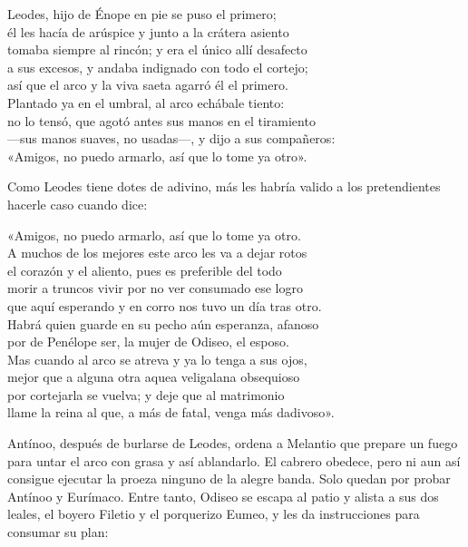 \begin{versocita}
Leodes, hijo de Énope en pie se puso el primero;\\
él les hacía de arúspice y junto a la crátera asiento\\
tomaba siempre al rincón; y era el único allí desafecto\\
a sus excesos, y andaba indignado con todo el cortejo;\\
así que el arco y la viva saeta agarró él el primero.\\
Plantado ya en el umbral, al arco echábale tiento:\\
no lo tensó, que agotó antes sus manos en el tiramiento\\
---sus manos suaves, no usadas---, y dijo a sus compañeros:\\
«Amigos, no puedo armarlo, así que lo tome ya otro».
\end{versocita}

Como Leodes tiene dotes de adivino, más les habría valido a los pretendientes hacerle caso cuando dice:

\begin{versocita}
«Amigos, no puedo armarlo, así que lo tome ya otro.\\
A muchos de los mejores este arco les va a dejar rotos\\
el corazón y el aliento, pues es preferible del todo\\
morir a truncos vivir por no ver consumado ese logro\\
que aquí esperando y en corro nos tuvo un día tras otro.\\
Habrá quien guarde en su pecho aún esperanza, afanoso\\
por de Penélope ser, la mujer de Odiseo, el esposo.\\
Mas cuando al arco se atreva y ya lo tenga a sus ojos,\\
mejor que a alguna otra aquea veligalana obsequioso\\
por cortejarla se vuelva; y deje que al matrimonio\\
llame la reina al que, a más de fatal, venga más dadivoso».
\end{versocita}

Antínoo, después de burlarse de Leodes, ordena a Melantio que prepare un fuego para untar el arco con grasa y así ablandarlo. El cabrero obedece, pero ni aun así consigue ejecutar la proeza ninguno de la alegre banda. Solo quedan por probar Antínoo y Eurímaco. Entre tanto, Odiseo se escapa al patio y alista a sus dos leales, el boyero Filetio y el porquerizo Eumeo, y les da instrucciones para consumar su plan:

